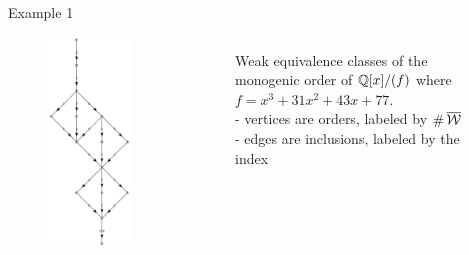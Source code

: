 \documentclass{beamer}
\begin{document}
\begin{frame}{Example 1}
\begin{figure}
    \begin{columns}%
        \begin{column}{0.6\textwidth}%
            \includegraphics[width=0.5\textwidth]{graph-4}
        \end{column}%
        \begin{column}{0.4\textwidth}%
            Weak equivalence classes of the monogenic order of $\mathbb{Q}[x]/(f)$ where $f=x^3+31x^2+43x+77$.\\
	    - vertices are orders, labeled by $\# \operatorname{\overline{\operatorname{{\mathcal W}}}}$\\
	    - edges are inclusions, labeled by the index
        \end{column}%
    \end{columns}
\end{figure}
\end{frame}
\end{document}
